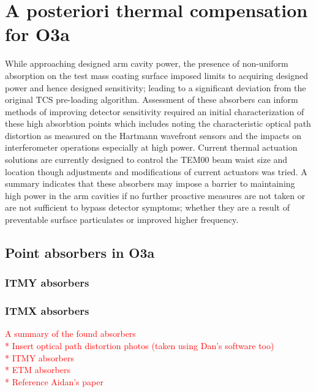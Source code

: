\section{A posteriori thermal compensation for O3a}
While approaching designed arm cavity power, the presence of non-uniform absorption on the test mass coating surface imposed limits to acquiring designed power and hence designed sensitivity; leading to a significant deviation from the original TCS pre-loading algorithm.  Assessment of these absorbers can inform methods of improving detector sensitivity required an initial characterization of these high absorbtion points which includes noting the characteristic optical path distortion as measured on the Hartmann wavefront sensors and the impacts on interferometer operations especially at high power. Current thermal actuation solutions are currently designed to control the TEM00 beam waist size and location though adjustments and modifications of current actuators was tried. A summary indicates that these absorbers may impose a barrier to maintaining high power in the arm cavities if no further proactive measures are not taken or are not sufficient to bypass detector symptoms; whether they are a result of preventable surface particulates or improved higher frequency.  


\subsection{Point absorbers in O3a}
\subsubsection{ITMY absorbers}


\subsubsection{ITMX absorbers}
\textcolor{red}{A summary of the found absorbers \\
	* Insert optical path distortion photos (taken using Dan's software too) \\
		* ITMY absorbers \\
		* ETM absorbers \\
	* Reference Aidan's paper} \\

